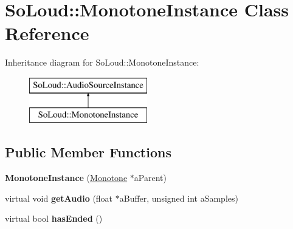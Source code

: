 \hypertarget{class_so_loud_1_1_monotone_instance}{}\section{So\+Loud\+:\+:Monotone\+Instance Class Reference}
\label{class_so_loud_1_1_monotone_instance}
Inheritance diagram for So\+Loud\+:\+:Monotone\+Instance\+:\begin{figure}[H]
\begin{center}
\leavevmode
\includegraphics[height=2.000000cm]{class_so_loud_1_1_monotone_instance}
\end{center}
\end{figure}
\subsection*{Public Member Functions}
\begin{DoxyCompactItemize}
\item 
\mbox{\label{class_so_loud_1_1_monotone_instance_aca1ab87876b7284b16a9dcdf57d59184}} 
{\bfseries Monotone\+Instance} (\mbox{\hyperlink{class_so_loud_1_1_monotone}{Monotone}} $\ast$a\+Parent)
\item 
\mbox{\label{class_so_loud_1_1_monotone_instance_a3a52ace28c260e0adb2835095a3ae5f6}} 
virtual void {\bfseries get\+Audio} (float $\ast$a\+Buffer, unsigned int a\+Samples)
\item 
\mbox{\label{class_so_loud_1_1_monotone_instance_a0770242189901128b7c4d8eb49d77562}} 
virtual bool {\bfseries has\+Ended} ()
\end{DoxyCompactItemize}
